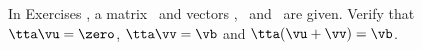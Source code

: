 {\noin In Exercises }
{, a matrix \tta\ and vectors \vb, \vu\ and \vv\ are given. Verify that $\tta\vu=\zero$, $\tta\vv=\vb$ and $\tta(\vu+\vv)=\vb$.}
